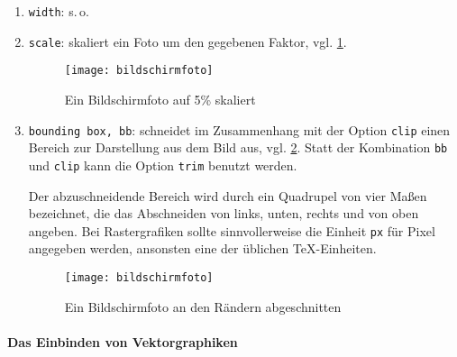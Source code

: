 \begin{enumerate}
  \item \texttt{width}: s.\,o.
  \item \texttt{scale}: skaliert ein Foto um den gegebenen Faktor,
    vgl. \cref{fig:bildschirm_05}.
    \begin{figure}[htb]
        \centering%
        \texttt{[image: bildschirmfoto]}
        \caption{Ein Bildschirmfoto auf 5\% skaliert} %
        \label{fig:bildschirm_05}
    \end{figure}

  \item \texttt{bounding box, bb}: schneidet im Zusammenhang mit der Option
    \texttt{clip} einen Bereich zur Darstellung aus dem Bild aus,
    vgl. \cref{fig:bildschirm_bb}. Statt der Kombination \texttt{bb} und
    \texttt{clip} kann die Option \texttt{trim} benutzt werden.

    Der abzuschneidende Bereich wird durch ein Quadrupel von vier Maßen
    bezeichnet, die das Abschneiden von links, unten, rechts und von oben
    angeben.  Bei Rastergrafiken sollte sinnvollerweise die Einheit
    \texttt{px} für Pixel angegeben werden, ansonsten eine der üblichen
    \TeX-Einheiten.
    \begin{figure}[htb]
        \centering%
        \texttt{[image: bildschirmfoto]}
        \caption{Ein Bildschirmfoto an den Rändern abgeschnitten} %
        \label{fig:bildschirm_bb}
    \end{figure}
\end{enumerate}


\paragraph{Das Einbinden von Vektorgraphiken}

